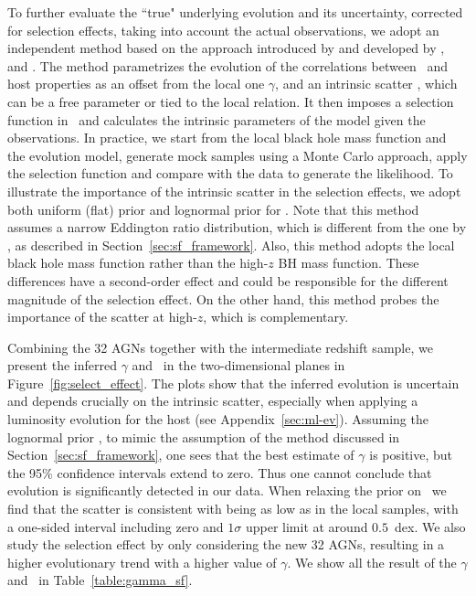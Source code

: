 \documentclass[apj]{emulateapj}
\begin{document}
To further evaluate the ``true" underlying evolution and its uncertainty, corrected for selection effects, taking into account the actual observations, we adopt an independent method based on the approach introduced by \citet{Tre++07} and developed by \citet{Ben++10}, \citet{Park15} and \citet{Ding2017b}. The method parametrizes the evolution of the correlations between \mbh\ and host properties as an offset from the local one $\gamma$, and an intrinsic scatter \sint, which can be a free parameter or tied to the local relation. It then imposes a selection function in \mbh\ and calculates the intrinsic parameters of the model given the observations. In practice, we start from the local black hole mass function and the evolution model, generate mock samples using a Monte Carlo approach, apply the selection function and compare with the data to generate the likelihood. To illustrate the importance of the intrinsic scatter in the selection effects, we adopt both uniform (flat) prior and lognormal prior for \sint. Note that this method assumes a narrow Eddington ratio distribution, which is different from the one by \citet{Schulze2011}, as described in Section~\ref{sec:sf_framework}. Also, this method adopts the local black hole mass function rather than the high-$z$ BH mass function. These differences have a second-order effect and could be responsible for the different magnitude of the selection effect. On the other hand, this method probes the importance of the scatter at high-$z$, which is complementary. 

Combining the 32 AGNs together with the intermediate redshift sample, we present the inferred  $\gamma$ and \sint\ in the two-dimensional planes in Figure~\ref{fig:select_effect}. The plots show that the inferred evolution is uncertain and depends crucially on the intrinsic scatter, especially when applying a luminosity evolution for the host (see Appendix~\ref{sec:ml-ev}). Assuming the lognormal prior \sint, to mimic the assumption of the method discussed in Section~\ref{sec:sf_framework}, one sees that the best estimate of $\gamma$ is positive, but the 95\% confidence intervals extend to zero. Thus one cannot conclude that evolution is significantly detected in our data. 
When relaxing the prior on \sint\ we find that the scatter is consistent with being as low as in the local samples, with a one-sided interval including zero and $1\sigma$ upper limit at around $0.5$~dex. 
We also study the selection effect by only considering the new 32 AGNs, resulting in a higher evolutionary trend with a higher value of $\gamma$. We show all the result of the $\gamma$ and \sint\ in Table~\ref{table:gamma_sf}.
\end{document}
